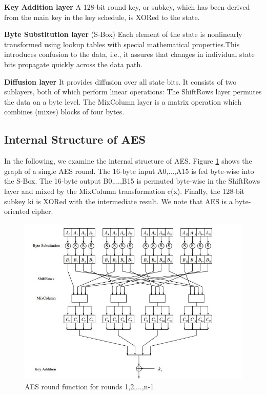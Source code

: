 \documentclass[../main.tex]{subfiles}
\begin{document}
\textbf{Key Addition layer} A 128-bit round key, or subkey, which has been derived from
the main key in the key schedule, is XORed to the state.

\textbf{Byte Substitution layer} (S-Box) Each element of the state is nonlinearly transformed using lookup tables with special mathematical properties.This introduces
confusion to the data, i.e., it assures that changes in individual state bits propagate
quickly across the data path.

\textbf{Diffusion layer} It provides diffusion over all state bits. It consists of two sublayers,
both of which perform linear operations:
 The ShiftRows layer permutes the data on a byte level.
 The MixColumn layer is a matrix operation which combines (mixes) blocks of four bytes.


\subsection{Internal Structure of AES}

In the following, we examine the internal structure of AES. Figure \ref{fig:cryp5} shows the
graph of a single AES round. The 16-byte input A0,...,A15 is fed byte-wise into the S-Box. The 16-byte output B0,...,B15 is permuted byte-wise in the ShiftRows layer
and mixed by the MixColumn transformation c(x). Finally, the 128-bit subkey ki is
XORed with the intermediate result. We note that AES is a byte-oriented cipher.\cite{10.5555/1721909}

\begin{figure}[h]
\centering
\includegraphics[width=13cm]{diagrams/cryp5.jpg}

\caption{AES round function for rounds 1,2,...,n-1}
\label{fig:cryp5}
\end{figure}
\end{document}
